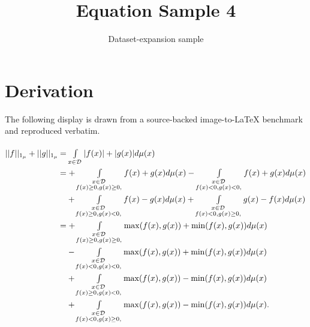 \documentclass[11pt]{article}
\title{Equation Sample 4}
\author{Dataset-expansion sample}
\date{}
\begin{document}
\maketitle
\section{Derivation}
The following display is drawn from a source-backed image-to-LaTeX benchmark and reproduced verbatim.

\begin{equation*}
\renewcommand{\arraystretch}{1.5}
\begin{array}
{@{}l@{\:}l@{}}
||f||_{1_{\mu}}+||g||_{1_{\mu}}
& =\int \limits_{x\in \mathcal{D}} |f(x)|+|g(x)| d \mu(x) \\
& = + \int \limits_{\substack{x \in \mathcal{D} \\f(x)\ge 0,g(x)\ge 0, }} f(x)+g(x) d\mu(x)
- \int \limits_{\substack{x \in \mathcal{D} \\f(x)<0,g(x)< 0, }}
f(x)+g(x) d\mu(x) \\
& \quad +\int \limits_{\substack{x \in \mathcal{D} \\f(x)\ge 0,g(x)< 0, }} f(x)-g(x) d\mu(x)
+ \int \limits_{\substack{x \in \mathcal{D} \\f(x)<0,g(x)\ge 0, }} g(x)-f(x) d\mu(x) \\
& = + \int \limits_{\substack{x \in \mathcal{D} \\f(x)\ge 0,g(x)\ge 0,
}} \max(f(x),g(x))+\min(f(x),g(x)) d\mu(x) \\
& \quad - \int \limits_{\substack{x \in \mathcal{D} \\f(x)<0,g(x)< 0, }}
\max(f(x),g(x))+\min(f(x),g(x)) d\mu(x) \\
& \quad +\int \limits_{\substack{x \in \mathcal{D} \\f(x)\ge 0,g(x)<
0, }} \max(f(x),g(x))-\min(f(x),g(x)) d\mu(x) \\
& \quad + \int \limits_{\substack{x \in \mathcal{D} \\f(x)<0,g(x)\ge
0, }} \max(f(x),g(x))-\min(f(x),g(x)) d\mu(x). \\
\end{array}
\renewcommand{\arraystretch}{1}
\end{equation*}
\end{document}
